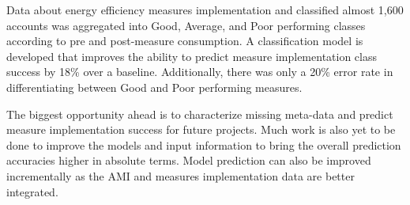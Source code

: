 Data about energy efficiency measures implementation and classified almost 1,600 accounts was aggregated into Good, Average, and Poor performing classes according to pre and post-measure consumption. A classification model is developed that improves the ability to predict measure implementation class success by 18\% over a baseline. Additionally, there was only a 20\% error rate in differentiating between Good and Poor performing measures.

The biggest opportunity ahead is to characterize missing meta-data and predict measure implementation success for future projects. Much work is also yet to be done to improve the models and input information to bring the overall prediction accuracies higher in absolute terms. Model prediction can also be improved incrementally as the AMI and measures implementation data are better integrated. 
